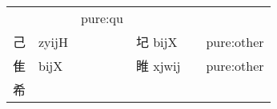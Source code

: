 \documentclass[14pt,a4paper]{scrartcl}
\begin{document}
\begin{longtable}[c]{@{}llllll@{}}
\begin{minipage}[t]{0.14\columnwidth}
\strut\end{minipage} &
\begin{minipage}[t]{0.14\columnwidth}\raggedright\strut
\strut\end{minipage} &
\begin{minipage}[t]{0.14\columnwidth}\raggedright\strut
pure:qu
\strut\end{minipage}\tabularnewline
\begin{minipage}[t]{0.14\columnwidth}\raggedright\strut
己
\strut\end{minipage} &
\begin{minipage}[t]{0.14\columnwidth}\raggedright\strut
zyijH
\strut\end{minipage} &
\begin{minipage}[t]{0.14\columnwidth}\raggedright\strut
\strut\end{minipage} &
\begin{minipage}[t]{0.14\columnwidth}\raggedright\strut
圮 bijX
\strut\end{minipage} &
\begin{minipage}[t]{0.14\columnwidth}\raggedright\strut
\strut\end{minipage} &
\begin{minipage}[t]{0.14\columnwidth}\raggedright\strut
pure:other
\strut\end{minipage}\tabularnewline
\begin{minipage}[t]{0.14\columnwidth}\raggedright\strut
隹
\strut\end{minipage} &
\begin{minipage}[t]{0.14\columnwidth}\raggedright\strut
bijX
\strut\end{minipage} &
\begin{minipage}[t]{0.14\columnwidth}\raggedright\strut
\strut\end{minipage} &
\begin{minipage}[t]{0.14\columnwidth}\raggedright\strut
睢 xjwij
\strut\end{minipage} &
\begin{minipage}[t]{0.14\columnwidth}\raggedright\strut
\strut\end{minipage} &
\begin{minipage}[t]{0.14\columnwidth}\raggedright\strut
pure:other
\strut\end{minipage}\tabularnewline
\begin{minipage}[t]{0.14\columnwidth}\raggedright\strut
希
\strut\end{minipage} &
\begin{minipage}[t]{0.14\columnwidth}\raggedright\strut

\end{minipage}
\end{longtable}
\end{document}
